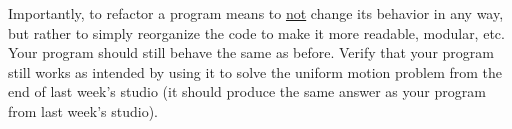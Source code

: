 \documentclass{article}
\begin{document}
Importantly, to refactor a program means to \ul{not} change its behavior in any way, but rather to simply reorganize the code to make it more readable, modular, etc. Your program should still behave the same as before. Verify that your program still works as intended by using it to solve the uniform motion problem from the end of last week's studio (it should produce the same answer as your program from last week's studio).
\end{document}
